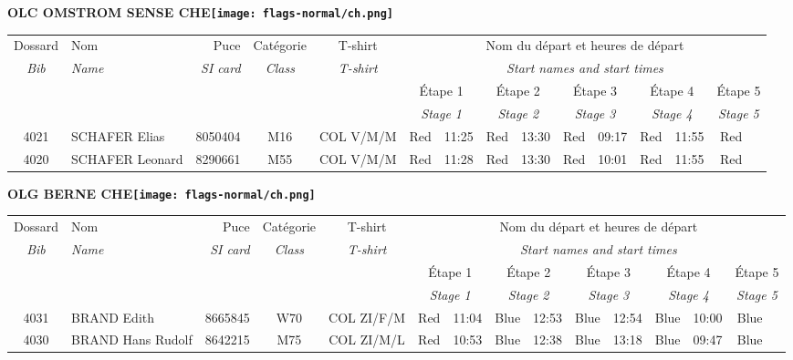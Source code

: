 \documentclass{report}
\begin{document}
\newpage
  \Huge \centering \bfseries OLC OMSTROM SENSE  CHE\normalfont \footnotesize \sffamily \hfill \texttt{[image: flags-normal/ch.png]} \newline 
  \begin{longtable}{|c|l|r|c|c|*{5}{cc|}}
    Dossard & Nom  & Puce    & Catégorie & T-shirt & \multicolumn{10}{c|}{Nom du départ et heures de départ} \\
    \itshape Bib     & \itshape Name & \itshape SI card & \itshape Class  & \itshape  T-shirt  & \multicolumn{10}{c|}{\itshape Start names and start times} \\
    \hline
    & & & & & \multicolumn{2}{c|}{Étape 1} & \multicolumn{2}{c|}{Étape 2} & \multicolumn{2}{c|}{Étape 3} & \multicolumn{2}{c|}{Étape 4} & \multicolumn{2}{c|}{Étape 5} \\
    & & & & & \multicolumn{2}{c|}{\itshape Stage 1} & \multicolumn{2}{c|}{\itshape Stage 2} & \multicolumn{2}{c|}{\itshape Stage 3} & \multicolumn{2}{c|}{\itshape Stage 4} & \multicolumn{2}{c|}{\itshape Stage 5} \\
    \hline
    4021 & SCHAFER Elias & 8050404 & M16 & COL V/M/M & Red & 11:25 & Red & 13:30 & Red & 09:17 & Red & 11:55 & Red &  \\
    4020 & SCHAFER Leonard & 8290661 & M55 & COL V/M/M & Red & 11:28 & Red & 13:30 & Red & 10:01 & Red & 11:55 & Red &  \\
  \end{longtable}
\newpage
  \Huge \centering \bfseries OLG BERNE  CHE\normalfont \footnotesize \sffamily \hfill \texttt{[image: flags-normal/ch.png]} \newline 
  \begin{longtable}{|c|l|r|c|c|*{5}{cc|}}
    Dossard & Nom  & Puce    & Catégorie & T-shirt & \multicolumn{10}{c|}{Nom du départ et heures de départ} \\
    \itshape Bib     & \itshape Name & \itshape SI card & \itshape Class  & \itshape  T-shirt  & \multicolumn{10}{c|}{\itshape Start names and start times} \\
    \hline
    & & & & & \multicolumn{2}{c|}{Étape 1} & \multicolumn{2}{c|}{Étape 2} & \multicolumn{2}{c|}{Étape 3} & \multicolumn{2}{c|}{Étape 4} & \multicolumn{2}{c|}{Étape 5} \\
    & & & & & \multicolumn{2}{c|}{\itshape Stage 1} & \multicolumn{2}{c|}{\itshape Stage 2} & \multicolumn{2}{c|}{\itshape Stage 3} & \multicolumn{2}{c|}{\itshape Stage 4} & \multicolumn{2}{c|}{\itshape Stage 5} \\
    \hline
    4031 & BRAND Edith & 8665845 & W70 & COL ZI/F/M & Red & 11:04 & Blue & 12:53 & Blue & 12:54 & Blue & 10:00 & Blue &  \\
    4030 & BRAND Hans Rudolf & 8642215 & M75 & COL ZI/M/L & Red & 10:53 & Blue & 12:38 & Blue & 13:18 & Blue & 09:47 & Blue &  \\
  \end{longtable}
\end{document}

